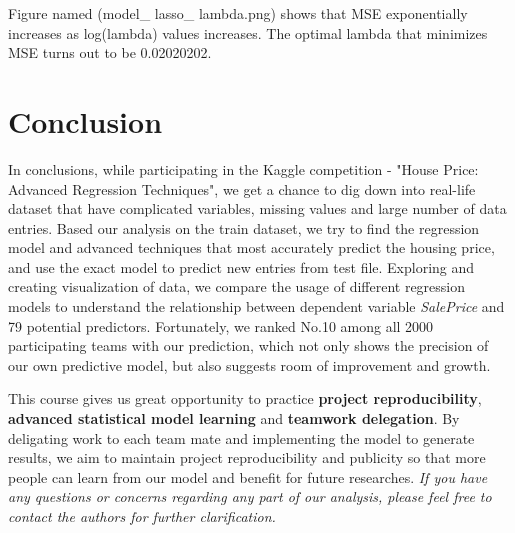 \documentclass[a4paper]{article}
\begin{document}
\begin{flushleft}
Figure named (model\_ lasso\_ lambda.png) shows that MSE exponentially increases as log(lambda) values increases. The optimal lambda that minimizes MSE turns out to be 0.02020202. 


\section{Conclusion}

In conclusions, while participating in the Kaggle competition - "House Price: Advanced Regression Techniques", we get a chance to dig down into real-life dataset that have complicated variables, missing values and large number of data entries. Based our analysis on the train dataset, we try to find the regression model and advanced techniques that most accurately predict the housing price, and use the exact model to predict new entries from test file. Exploring and creating visualization of data, we compare the usage of different regression models to understand the relationship between dependent variable \textit{SalePrice} and 79 potential predictors. Fortunately, we ranked No.10 among all 2000 participating teams with our prediction, which not only shows the precision of our own predictive model, but also suggests room of improvement and growth. \newline

This course gives us great opportunity to practice \textbf{project reproducibility}, \textbf{advanced statistical model learning} and \textbf{teamwork delegation}. By deligating work to each team mate and implementing the model to generate results, we aim to maintain project reproducibility and publicity so that more people can learn from our model and benefit for future researches. \textit{If you have any questions or concerns regarding any part of our analysis, please feel free to contact the authors for further clarification.} \newline

\end{flushleft}
\end{document}
